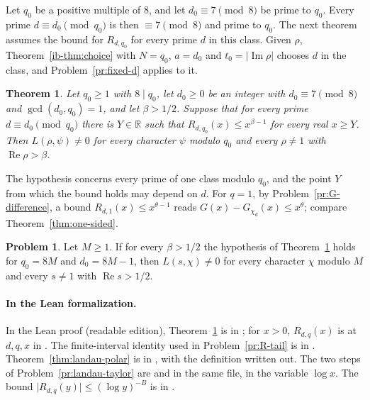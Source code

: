 \documentclass[reqno]{amsart}
\theoremstyle{definition}
\newtheorem{problem}{Problem}[section]
\theoremstyle{plain}
\newtheorem{theorem}{Theorem}[section]
\newcommand{\R}{\mathbb{R}}
\renewcommand{\Re}{\operatorname{Re}}
\renewcommand{\Im}{\operatorname{Im}}
\begin{document}
Let $q_0$ be a positive multiple of $8$, and let $d_0 \equiv 7 \pmod 8$ be prime to $q_0$.  Every prime $d \equiv d_0 \pmod{q_0}$ is then $\equiv 7 \pmod 8$ and prime to $q_0$.  The next theorem assumes the bound for $R_{d,q_0}$ for every prime $d$ in this class.  Given $\rho$, Theorem~\ref{ib-thm:choice} with $N = q_0$, $a = d_0$ and $t_0 = \lvert \Im \rho \rvert$ chooses $d$ in the class, and Problem~\ref{pr:fixed-d} applies to it.

\begin{theorem}\label{thm:dirichlet}
Let $q_0 \ge 1$ with $8 \mid q_0$, let $d_0 \ge 0$ be an integer with $d_0 \equiv 7 \pmod 8$ and $\gcd(d_0, q_0) = 1$, and let $\beta > 1/2$.  Suppose that for every prime $d \equiv d_0 \pmod{q_0}$ there is $Y \in \R$ such that $R_{d,q_0}(x) \le x^{\beta - 1}$ for every real $x \ge Y$.  Then $L(\rho, \psi) \ne 0$ for every character $\psi$ modulo $q_0$ and every $\rho \ne 1$ with $\Re \rho > \beta$.
\end{theorem}

The hypothesis concerns every prime of one class modulo $q_0$, and the point $Y$ from which the bound holds may depend on $d$.  For $q = 1$, by Problem~\ref{pr:G-difference}, a bound $R_{d,1}(x) \le x^{\theta - 1}$ reads $G(x) - G_{\chi_d}(x) \le x^\theta$; compare Theorem~\ref{thm:one-sided}.

\begin{problem}\label{pr:rh-dirichlet}
Let $M \ge 1$.  If for every $\beta > 1/2$ the hypothesis of Theorem~\ref{thm:dirichlet} holds for $q_0 = 8M$ and $d_0 = 8M - 1$, then $L(s, \chi) \ne 0$ for every character $\chi$ modulo $M$ and every $s \ne 1$ with $\Re s > 1/2$.
\end{problem}

{\raggedright
\paragraph{In the Lean formalization.}
In the Lean proof \cite{GL} (readable edition), Theorem~\ref{thm:dirichlet} is  in ; for $x > 0$, $R_{d,q}(x)$ is  at $d, q, x$ in .  The finite-interval identity used in Problem~\ref{pr:R-tail} is  in .  Theorem~\ref{thm:landau-polar} is  in , with the definition  written out.  The two steps of Problem~\ref{pr:landau-taylor} are  and  in the same file, in the variable $\log x$.  The bound $\lvert R_{d,q}(y) \rvert \le (\log y)^{-B}$ is  in .\par}
\end{document}
